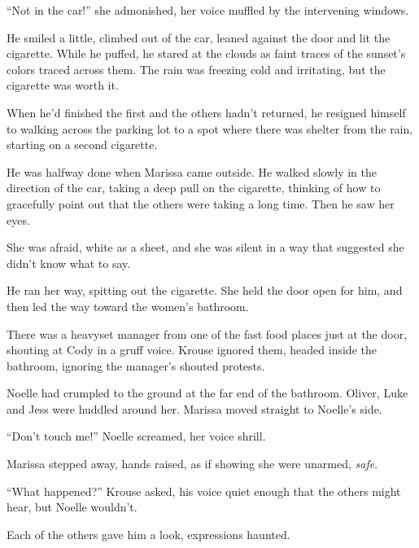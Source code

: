 ``Not in the car!'' she admonished, her voice muffled by the intervening windows.



He smiled a little, climbed out of the car, leaned against the door and lit the cigarette.  While he puffed, he stared at the clouds as faint traces of the sunset's colors traced across them.  The rain was freezing cold and irritating, but the cigarette was worth it.



When he'd finished the first and the others hadn't returned, he resigned himself to walking across the parking lot to a spot where there was shelter from the rain, starting on a second cigarette.



He was halfway done when Marissa came outside.  He walked slowly in the direction of the car, taking a deep pull on the cigarette, thinking of how to gracefully point out that the others were taking a long time.  Then he saw her eyes.



She was afraid, white as a sheet, and she was silent in a way that suggested she didn't know what to say.



He ran her way, spitting out the cigarette.  She held the door open for him, and then led the way toward the women's bathroom.



There was a heavyset manager from one of the fast food places just at the door, shouting at Cody in a gruff voice.  Krouse ignored them, headed inside the bathroom, ignoring the manager's shouted protests.



Noelle had crumpled to the ground at the far end of the bathroom.  Oliver, Luke and Jess were huddled around her.  Marissa moved straight to Noelle's side.



``Don't touch me!''  Noelle screamed, her voice shrill.



Marissa stepped away, hands raised, as if showing she were unarmed, \emph{safe}.



``What happened?'' Krouse asked, his voice quiet enough that the others might hear, but Noelle wouldn't.



Each of the others gave him a look, expressions haunted.



